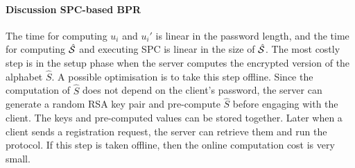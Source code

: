 \paragraph{Discussion SPC-based BPR}
The time for computing $u_i$ and $u_i'$ is linear in the password length, and the time for computing $\hat{\mathcal{S}}$ and executing \ac{SPC} is linear in the size of $\hat{\mathcal{S}}$. 
The most costly step is in the setup phase when the server computes the encrypted version of the alphabet $\hat{S}$.
A possible optimisation is to take this step offline. 
Since the computation of $\hat{S}$ does not depend on the client's password, the server can generate a random RSA key pair and pre-compute $\hat{S}$ before engaging with the client. 
The keys and pre-computed values can be stored together. 
Later when a client sends a registration request, the server can retrieve them and run the protocol. 
If this step is taken offline, then the online computation cost is very small.
